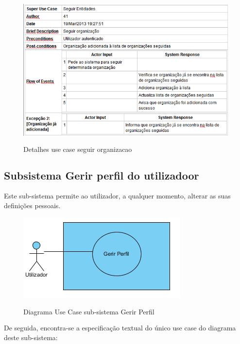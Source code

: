 ﻿\documentclass[12pt,a4paper]{article}
\begin{document}
\begin{figure}[h!]
\centering
\includegraphics[scale=0.7]{d_usecase/seguirorganizacao}
\label{usecase}
\caption{Detalhes use case seguir organizacao}
\end{figure}

\newpage
\subsection{Subsistema Gerir perfil do utilizadoor}
Este sub-sistema permite ao utilizador, a qualquer momento, alterar as suas definições pessoais.\\

\begin{figure}[h!]
\centering
\includegraphics[scale=1]{usecase/U_GerirPerfil}
\label{usecase}
\caption{Diagrama Use Case sub-sistema Gerir Perfil}
\end{figure}

De seguida, encontra-se a especificação textual do único use case do diagrama deste sub-sistema:\\
\end{document}
